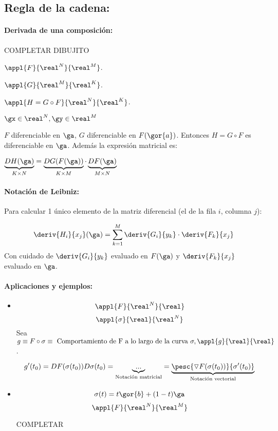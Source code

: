 \documentclass[a4paper,10pt]{apuntes}
\begin{document}
\subsection{Regla de la cadena: }
\paragraph{Derivada de una composición:\\}

COMPLETAR DIBUJITO

$\appl{F}{\real^N}{\real^M}$. 

$\appl{G}{\real^M}{\real^K}$.

$\appl{H=G\circ F}{\real^N}{\real^K}$.

$ \gx \in \real^N, \gy \in \real^M$

$F$ diferenciable en $\ga$, $G$ diferenciable en $F(\gor{a})$. Entonces $H=G\circ F$ es diferenciable en $\ga $.
Además la expresión matricial es:

$\underbrace{DH(\ga)}_{K\times N} = \underbrace{DG(F(\ga))}_{K\times M}\cdot \underbrace{DF(\ga)}_{M\times N}$
 
\obs
\paragraph{Notación de Leibniz:}

Para calcular 1 único elemento de la matriz diferencial (el de la fila $i$, columna $j$):

$$\deriv{H_i}{x_j}(\ga) = \displaystyle\sum_{k=1}^M \deriv{G_i}{y_k}\cdot\deriv{F_k}{x_j}$$
Con cuidado de $\displaystyle \deriv{G_i}{y_k}$ evaluado en $F(\ga)$ y $\deriv{F_k}{x_j}$ evaluado en $\ga$.

\paragraph{Aplicaciones y ejemplos:}
\begin{itemize}
 \item 
 \[\appl{F}{\real^N}{\real}\]
 \[\appl{\sigma}{\real}{\real^N}\]
 Sea $g\equiv F\circ \sigma \equiv \text{ Comportamiento de F a lo largo de la curva } \sigma, \appl{g}{\real}{\real}$.

$$g'(t_0) = DF(\sigma(t_0))D\sigma(t_0) = \underbrace{...}_{\text{Notación matricial}} = \underbrace{\pesc{\triangledown F(\sigma(t_0))}{\sigma'(t_0)}}_{\text{Notación vectorial}}$$

 
 \item 
 $$\sigma(t) = t\gor{b} + (1-t)\ga$$
 \[\appl{F}{\real^N}{\real^M}\]
 
 COMPLETAR
\end{itemize}
\end{document}
